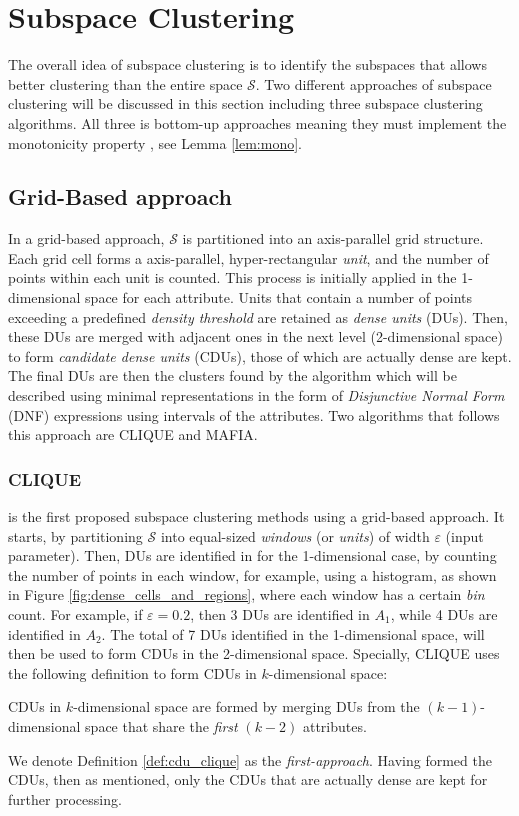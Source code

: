 \section{Subspace Clustering}
The overall idea of subspace clustering is to identify the subspaces that allows better clustering than the entire space $\mathcal{S}$. Two different approaches of subspace clustering will be discussed in this section including three subspace clustering algorithms. All three is bottom-up approaches meaning they must implement the monotonicity property \cite[p.~1:11]{kriegel-2009}, see Lemma \ref{lem:mono}.

\subsection{Grid-Based approach}
In a grid-based approach, $\mathcal{S}$ is partitioned into an axis-parallel grid structure. Each grid cell forms a axis-parallel, hyper-rectangular \textit{unit}, and the number of points within each unit is counted. This process is initially applied in the 1-dimensional space for each attribute. Units that contain a number of points exceeding a predefined \textit{density threshold} are retained as \textit{dense units} (DUs). Then, these DUs are merged with adjacent ones in the next level (2-dimensional space) to form \textit{candidate dense units} (CDUs), those of which are actually dense are kept. The final DUs are then the clusters found by the algorithm which will be described using minimal representations in the form of \textit{Disjunctive Normal Form} (DNF) expressions using intervals of the attributes. Two algorithms that follows this approach are CLIQUE and MAFIA.

\subsubsection{CLIQUE}
is the first proposed subspace clustering methods using a grid-based approach. It starts, by partitioning $\mathcal{S}$ into equal-sized \textit{windows} (or \textit{units}) of width $\varepsilon$ (input parameter). Then, DUs are identified in for the 1-dimensional case, by counting the number of points in each window, for example, using a histogram, as shown in Figure \ref{fig:dense_cells_and_regions}, where each window has a certain \textit{bin} count. For example, if $\varepsilon = 0.2$, then 3 DUs are identified in $A_1$, while 4 DUs are identified in $A_2$. The total of 7 DUs identified in the 1-dimensional space, will then be used to form CDUs in the 2-dimensional space. Specially, CLIQUE uses the following definition to form CDUs in $k$-dimensional space:
\begin{definition}\label{def:cdu_clique}
    CDUs in $k$-dimensional space are formed by merging DUs from the $(k-1)$-dimensional space that share the \textit{first} $(k-2)$ attributes.
\end{definition}
We denote Definition \ref{def:cdu_clique} as the \textit{first-approach}. Having formed the CDUs, then as mentioned, only the CDUs that are actually dense are kept for further processing.

